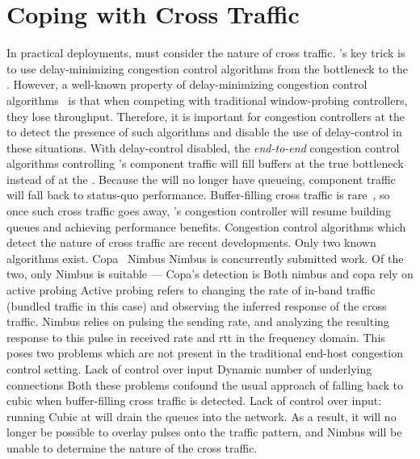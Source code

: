 \section{Coping with Cross Traffic}\label{s:queue-ctl}

\begin{outline}
\1 In practical deployments, \name must consider the nature of cross traffic.
\1 \name's key trick is to use delay-minimizing congestion control algorithms from the bottleneck to the \inbox.
\1 However, a well-known property of delay-minimizing congestion control algorithms~\cite{pantheon} is that when competing with traditional window-probing controllers, they lose throughput.
\1 Therefore, it is important for congestion controllers at the \inbox to detect the presence of such algorithms and disable the use of delay-control in these situations.
    \2 With delay-control disabled, the \emph{end-to-end} congestion control algorithms controlling \name's component traffic will fill buffers at the true bottleneck instead of at the \inbox.
    \2 Because the \inbox will no longer have queueing, component traffic will fall back to status-quo performance.
    \2 Buffer-filling cross traffic is rare~\cite{something}, so once such cross traffic goes away, \name's congestion controller will resume building queues and achieving performance benefits.
\1 Congestion control algorithms which detect the nature of cross traffic are recent developments. Only two known algorithms exist.
    \2 Copa~\cite{copa}
    \2 Nimbus
        \3 Nimbus is concurrently submitted work.
    \2 Of the two, only Nimbus is suitable --- Copa's detection is 
\1 Both nimbus and copa rely on active probing
    \2 Active probing refers to changing the rate of in-band traffic (bundled traffic in this case) and observing the inferred response of the cross traffic.
\1 Nimbus relies on pulsing the sending rate, and analyzing the resulting response to this pulse in received rate and rtt in the frequency domain.
    \2 This poses two problems which are not present in the traditional end-host congestion control setting.
        \3 Lack of control over input
        \3 Dynamic number of underlying connections
    \2 Both these problems confound the usual approach of falling back to cubic when buffer-filling cross traffic is detected.
        \3 Lack of control over input: running Cubic at \inbox will drain the queues into the network. As a result, it will no longer be possible to overlay pulses onto the traffic pattern, and Nimbus will be unable to determine the nature of the cross traffic.

\end{outline}
